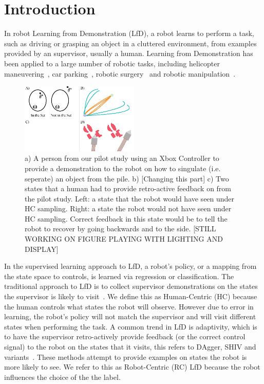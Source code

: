 \documentclass[10pt, conference]{ieeeconf}      %
\begin{document}
\section{Introduction} 
In robot Learning from Demonstration (LfD), a robot learns to perform a task, such as driving or grasping an object in a cluttered environment, from examples provided by an supervisor, usually a human. Learning from Demonstration has been applied to a large number of robotic tasks, including helicopter maneuvering~\cite{abbeel2007application}, car parking~\cite{abbeel2008apprenticeship}, robotic surgery~\cite{van2010superhuman,laskeyshiv} and robotic manipulation~\cite{laskeyrobot}. 

\begin{figure}
\center
\includegraphics[width=0.5\textwidth]{f_figs/teaser.eps}
\caption{
    \footnotesize
 a) A person from our pilot study using an Xbox Controller to provide a demonstration to the robot on how to singulate (i.e. seperate) an object from the pile.  b) [Changing this part]  c) Two states that a human had to provide retro-active feedback on from the pilot study. Left: a state that the robot would have seen under HC sampling. Right: a state the robot would not have seen under HC sampling. Correct feedback in this state would be to tell the robot to recover by going backwards and to the side. [STILL WORKING ON FIGURE PLAYING WITH LIGHTING AND DISPLAY]}
\vspace*{-20pt}
\label{fig:teaserl}
\end{figure}


In the supervised learning approach to LfD, a robot's policy, or a mapping from the state space to controls, is learned via regression or classification. The traditional approach to LfD is to collect supervisor demonstrations on the states the supervisor is likely to visit~\cite{pomerleau1989alvinn}. We define this as Human-Centric (HC) because the human controls what states the robot will observe. However due to error in learning, the robot's policy will not match the supervisor and will visit different states when performing the task. A common trend in LfD is adaptivity, which is to have the supervisor retro-actively provide feedback (or the correct control signal) to the robot on the states that it visits, this refers to DAgger, SHIV and variants~\cite{ross2010efficient,ross2010reduction,laskeyrobot,laskeyshiv,he2012imitation}.
These methods attempt to provide examples on states the robot is more likely to see.  We refer to this as Robot-Centric (RC) LfD because the robot influences the choice of the the label. 
\end{document}
